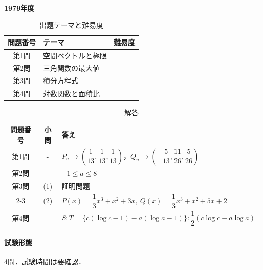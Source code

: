 \documentclass[../../main.tex]{subfiles}
\begin{document}
\begin{center}
  {\fontsize{48pt}{58pt}\selectfont \textbf{1979}\normalsize\textbf{年度}}
\end{center}

\begin{table}[htb]
  \centering
  \caption{出題テーマと難易度}
  \begin{tabular}{|c|p{9cm}|c|}
    \hline
    \textbf{問題番号} & \textbf{テーマ} & \textbf{難易度} \\
    \hline
    第1問 & 空間ベクトルと極限 & \\
    \hline
    第2問 & 三角関数の最大値 & \\
    \hline
    第3問 & 積分方程式 & \\
    \hline
    第4問 & 対数関数と面積比 & \\
    \hline
  \end{tabular}
\end{table}

\begin{table}[htb]
  \centering
  \caption{解答}
  \renewcommand{\arraystretch}{1.4}
  \begin{tabular}{|c|c|p{9cm}|}
    \hline
    \textbf{問題番号} & \textbf{小問} & \textbf{答え} \\
    \hline
    第1問 & - & $P_n\to\left(\dfrac{1}{13},\dfrac{1}{13},\dfrac{1}{13}\right)$，$Q_n\to\left(-\dfrac{5}{13},\dfrac{11}{26},\dfrac{5}{26}\right)$ \\
    \hline
    第2問 & - & $-1\le a\le8$ \\
    \hline
    第3問 & (1) & 証明問題 \\
    \cline{2-3}
    & (2) & $P(x)=\dfrac{1}{3}x^3+x^2+3x,\ Q(x)=\dfrac{1}{3}x^3+x^2+5x+2$ \\
    \hline
    第4問 & - & $S:T=\{c(\log c-1)-a(\log a-1)\}:\dfrac{1}{2}(c\log c-a\log a)$ \\
    \hline
  \end{tabular}
\end{table}

\paragraph{試験形態}
4問．試験時間は要確認．
\end{document}
